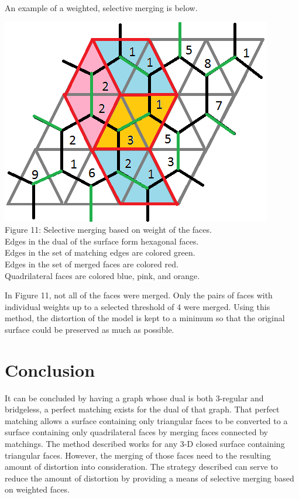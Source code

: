 \documentclass[12pt]{article}
\begin{document}
\begin{flushleft}
\newpage
\medskip
An example of a weighted, selective merging is below.

\begin{center}
\includegraphics[scale=1]{images/weightedmerging.png}\\
Figure 11: Selective merging based on weight of the faces.\\
Edges in the dual of the surface form hexagonal faces.\\
Edges in the set of matching edges are colored green.\\
Edges in the set of merged faces are colored red.\\
Quadrilateral faces are colored blue, pink, and orange.
\end{center}

\medskip
In Figure 11, not all of the faces were merged. Only the pairs of faces with individual weights up to a selected threshold of 4 were merged. Using this method, the distortion of the model is kept to a minimum so that the original surface could be preserved as much as possible.

\section*{Conclusion}
It can be concluded by having a graph whose dual is both 3-regular and bridgeless, a perfect matching exists for the dual of that graph. That perfect matching allows a surface containing only triangular faces to be converted to a surface containing only quadrilateral faces by merging faces connected by matchings. The method described works for any 3-D closed surface containing triangular faces. However, the merging of those faces need to the resulting amount of distortion into consideration. The strategy described can serve to reduce the amount of distortion by providing a means of selective merging based on weighted faces.


\end{flushleft}
\end{document}
